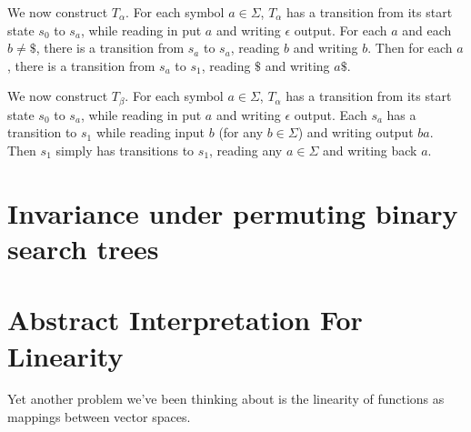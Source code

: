 \documentclass{llncs}
\begin{document}
We now construct $T_\alpha$.
For each symbol $a \in \Sigma$,
$T_\alpha$ has a transition from its start
state $s_0$ to $s_a$, while reading in put $a$ and 
writing $\epsilon$ output.
For each $a$ and each $b\ne \$$, there is a
transition from $s_a$ to $s_a$, reading $b$
and writing $b$.
Then for each $a$, there is a transition from 
$s_a$ to $s_1$, reading $\$$ and writing $a\$$.

We now construct $T_\beta$.
For each symbol $a \in \Sigma$,
$T_\alpha$ has a transition from its start
state $s_0$ to $s_a$, while reading in put $a$ and 
writing $\epsilon$ output.
Each $s_a$ has a transition to $s_1$ while
reading input $b$ (for any $b\in \Sigma$)
and writing output $ba$.
Then $s_1$ simply has transitions to $s_1$,
reading any $a\in \Sigma$ and writing
back $a$.

\iffalse %
\subsection{Programs}
The previous section indicates a method for verifying
robustness of more general programs under permutation of inputs. 
Given a procedure $F$ taking an array as argument, consider the functions $F_\alpha$, which first swaps the first two elements of the array, then computes $F$, and $F_\beta$, which moves the first element of the array to the back, then computes $F$. Then $F$ is invariant under permutation of its input if and only if $F$ is functionally equivalent to $F_\alpha$ and $F_\beta$.

Certainly this method is more efficient than checking invariance under a larger class of permutations. For DFAs, this simplification made the problem of permutation invariance solvable. This indicates that this simplification may aid in our analysis in a profound way. For example, this may be a much easier way of verifying this invariance compared to expressing permutations as a general $2$-safety property.
\fi

\section{Invariance under permuting binary search trees}

\iffalse %
\section{Abstract Interpretation For Linearity}
Yet another problem we've been thinking about is the linearity of functions as mappings between vector spaces.
\end{document}
